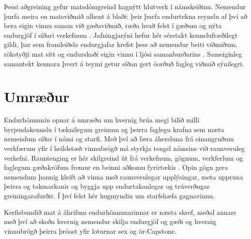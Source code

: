 \documentclass{kennsluakademia_conf}
\begin{document}
Þessi aðgreining gefur matsdómgreind hagnýtt hlutverk í námskeiðinu.
Nemendur þurfa meira en matsviðmið afhent á blaði: þeir þurfa endurtekna
reynslu af því að bera eigin vinnu saman við gæðaviðmið, ræða hvað felst
í gæðum og nýta endurgjöf í síðari verkefnum
\citep{CarlessBoud2018FeedbackLiteracy}. Jafningjarýni hefur hér
sérstakt kennslufræðilegt gildi, þar sem framleiðsla endurgjafar krefst
þess að nemendur beiti viðmiðum, rökstyðji mat sitt og endurskoði eigin
vinnu í ljósi samanburðarins
\citep{NicolThomsonBreslin2014PeerReviewFeedback}. Sameiginleg samantekt
kennara þvert á teymi getur síðan gert óorðuð fagleg viðmið sýnilegri.


\section{Umræður}\label{umruxe6uxf0ur}

Endurhönnunin opnar á umræðu um hvernig brúa megi bilið milli
byrjendakennslu í tæknilegum greinum og þeirra faglegu krafna sem mæta
nemendum síðar í námi og starfi. Með því að færa áhersluna frá
einangruðum verkfærum yfir í heildstæð vinnubrögð má styrkja tengsl
námsins við raunveruleg verkefni. Rauntenging er hér skilgreind út frá
verkefnum, gögnum, verkferlum og faglegum gæðakröfum fremur en beinni
aðkomu fyrirtækis
\citep{Palmer2004AuthenticityAssessment, VillarroelEtAl2018AuthenticAssessment}.
Opin gögn gera nemendum þannig kleift að vinna með raunverulegar
upplýsingar, meta uppruna þeirra og takmarkanir og byggja upp
endurtakanlegar og trúverðugar greiningarafurðir. Í því felst hér
hugmyndin um starfshæfa gagnavinnu.

Kerfisbundið mat á áhrifum endurhönnunarinnar er næsta skref, meðal
annars með því að skoða hvernig nemendur skilja endurgjöf og gæði og
hvernig vinnubrögð þeirra þróast yfir loturnar sex og ör-Capstone.



\end{document}
